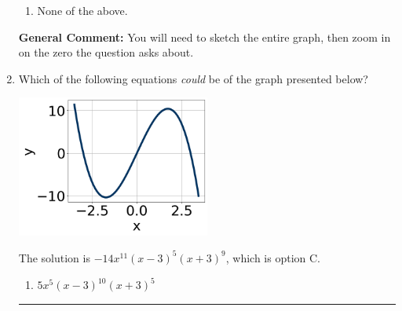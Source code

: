 \documentclass{extbook}[14pt]
\newcommand{\litem}[1]{\item #1

\rule{\textwidth}{0.4pt}}
\begin{document}
\begin{enumerate}
{\begin{enumerate}[label=\Alph*.]
\item None of the above.\end{enumerate}
\textbf{General Comment:} You will need to sketch the entire graph, then zoom in on the zero the question asks about.
}
\litem{
Which of the following equations \textit{could} be of the graph presented below?

\begin{center}
    \includegraphics[width=0.5\textwidth]{../Figures/polyGraphToFunctionA.png}
\end{center}


The solution is \( -14x^{11} (x - 3)^{5} (x + 3)^{9} \), which is option C.\begin{enumerate}[label=\Alph*.]
\item \( 5x^{5} (x - 3)^{10} (x + 3)^{5} \)


\end{enumerate}}
\end{enumerate}
\end{document}
